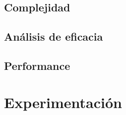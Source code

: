\documentclass[a4paper, 10pt, twoside]{article}
\begin{document}
\subsection{Complejidad}
\subsection{Análisis de eficacia}
\subsection{Performance}



\newpage

\section{Experimentación}
\end{document}
